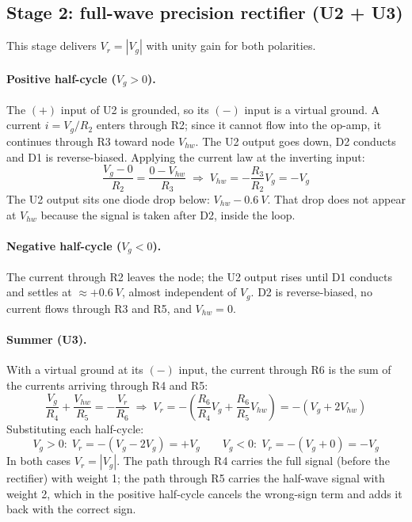 \documentclass[11pt,letterpaper]{article}
\newcommand{\Vg}{V_g}
\newcommand{\Vr}{V_r}
\begin{document}
\subsection{Stage 2: full-wave precision rectifier (U2 + U3)}

This stage delivers $\Vr=|\Vg|$ with unity gain for both polarities.

\paragraph{Positive half-cycle ($\Vg>0$).} The $(+)$ input of U2 is grounded, so its $(-)$ input is a virtual ground. A current $i=\Vg/R_2$ enters through R2; since it cannot flow into the op-amp, it continues through R3 toward node $V_{hw}$. The U2 output goes down, D2 conducts and D1 is reverse-biased. Applying the current law at the inverting input:
\begin{equation}
\frac{\Vg-0}{R_2}=\frac{0-V_{hw}}{R_3}\;\Rightarrow\; V_{hw}=-\frac{R_3}{R_2}\Vg=-\Vg
\end{equation}
The U2 output sits one diode drop below: $V_{hw}-\SI{0.6}{V}$. That drop does not appear at $V_{hw}$ because the signal is taken after D2, inside the loop.

\paragraph{Negative half-cycle ($\Vg<0$).} The current through R2 leaves the node; the U2 output rises until D1 conducts and settles at $\approx+\SI{0.6}{V}$, almost independent of $\Vg$. D2 is reverse-biased, no current flows through R3 and R5, and $V_{hw}=0$.

\paragraph{Summer (U3).} With a virtual ground at its $(-)$ input, the current through R6 is the sum of the currents arriving through R4 and R5:
\begin{equation}
\frac{\Vg}{R_4}+\frac{V_{hw}}{R_5}=-\frac{\Vr}{R_6}\;\Rightarrow\;\Vr=-\left(\frac{R_6}{R_4}\Vg+\frac{R_6}{R_5}V_{hw}\right)=-\left(\Vg+2V_{hw}\right)
\label{eq:sumador}
\end{equation}
Substituting each half-cycle:
\begin{equation}
\Vg>0:\;\Vr=-(\Vg-2\Vg)=+\Vg \qquad \Vg<0:\;\Vr=-(\Vg+0)=-\Vg
\end{equation}
In both cases $\Vr=|\Vg|$. The path through R4 carries the full signal (before the rectifier) with weight 1; the path through R5 carries the half-wave signal with weight 2, which in the positive half-cycle cancels the wrong-sign term and adds it back with the correct sign.
\end{document}
